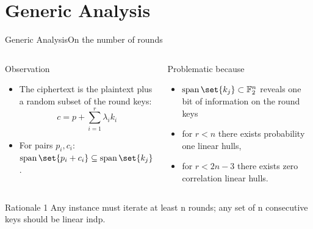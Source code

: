 \section{Generic Analysis}
\begin{frame}{Generic Analysis}{On the number of rounds}
    \begin{columns}
        \begin{column}{0.49\textwidth}
            \begin{block}{Observation}
                \begin{itemize}
                    \item The ciphertext is the plaintext plus a random subset of the round keys:
                        \begin{equation*}
                            c = p + \sum_{i=1}^{r} \lambda_i k_i
                        \end{equation*}
                    \item For pairs $p_i, c_i$: $\Span \set{p_i + c_i} \subseteq \Span \set{k_j}$.
                \end{itemize}
            \end{block}
        \end{column}
        \begin{column}{0.49\textwidth}
            \begin{alertblock}{Problematic because}
                \vspace{1.5pt}
                \begin{itemize}
                    \item $\Span \set{k_j} \subset \F_2^n$ reveals one bit of information on the round keys\\[7pt]
                    \item for $r < n$ there exists probability one linear hulls,\\[7pt]
                    \item for $r < 2n - 3$ there exists zero correlation linear hulls.
                \end{itemize}
                \vspace{1.5pt}
            \end{alertblock}
        \end{column}
    \end{columns}
    \hspace*{-8.5pt}
    \begin{minipage}{1.0145\textwidth}
    \begin{exampleblock}{Rationale 1}
        Any instance must iterate at least n rounds; any set of n consecutive keys should be linear indp.
    \end{exampleblock}
    \end{minipage}
\end{frame}


